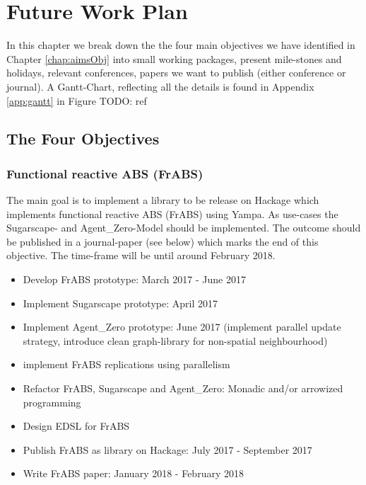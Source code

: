 \chapter{Future Work Plan}
\label{chap:future}


In this chapter we break down the the four main objectives we have identified in Chapter \ref{chap:aimsObj} into small working packages, present mile-stones and holidays, relevant conferences, papers we want to publish (either conference or journal). A Gantt-Chart, reflecting all the details is found in Appendix \ref{app:gantt} in Figure TODO: ref

\section{The Four Objectives}
\subsection{Functional reactive ABS (FrABS)}
The main goal is to implement a library to be release on Hackage which implements functional reactive ABS (FrABS) using Yampa. As use-cases the Sugarscape- and Agent\_Zero-Model should be implemented. The outcome should be published in a journal-paper (see below) which marks the end of this objective. The time-frame will be until around February 2018.

\begin{itemize}
\item Develop FrABS prototype: March 2017 - June 2017
\item Implement Sugarscape prototype: April 2017
\item Implement Agent\_Zero prototype: June 2017 (implement parallel update strategy, introduce clean graph-library for non-spatial neighbourhood)
\item implement FrABS replications using parallelism
\item Refactor FrABS, Sugarscape and Agent\_Zero: Monadic and/or arrowized programming
\item Design EDSL for FrABS
\item Publish FrABS as library on Hackage: July 2017 - September 2017
\item Write FrABS paper: January 2018 - February 2018
\end{itemize}

